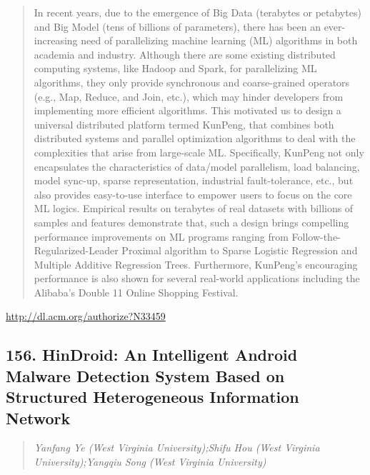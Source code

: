 \documentclass{article}
\begin{document}
\begin{quote}
In recent years, due to the emergence of Big Data (terabytes or petabytes) and Big Model (tens of billions of parameters), there has been an ever-increasing need of parallelizing machine learning (ML) algorithms in both academia and industry. Although there are some existing distributed computing systems, like Hadoop and Spark, for parallelizing ML algorithms, they only provide synchronous and coarse-grained operators (e.g., Map, Reduce, and Join, etc.), which may hinder developers from implementing more efficient algorithms. This motivated us to design a universal distributed platform termed KunPeng, that combines both distributed systems and parallel optimization algorithms to deal with the complexities that arise from large-scale ML. Specifically, KunPeng not only encapsulates the characteristics of data/model parallelism, load balancing, model sync-up, sparse representation, industrial fault-tolerance, etc., but also provides easy-to-use interface to empower users to focus on the core ML logics. Empirical results on terabytes of real datasets with billions of samples and features demonstrate that, such a design brings compelling performance improvements on ML programs ranging from Follow-the-Regularized-Leader Proximal algorithm to Sparse Logistic Regression and Multiple Additive Regression Trees. Furthermore, KunPeng’s encouraging performance is also shown for several real-world applications including the Alibaba’s Double 11 Online Shopping Festival.
\end{quote}

\href{http://dl.acm.org/authorize?N33459}{http://dl.acm.org/authorize?N33459}

\subsection{156. HinDroid: An Intelligent Android Malware Detection System Based on Structured Heterogeneous Information Network}

\begin{quote}
\footnotesize{\textit{Yanfang Ye (West Virginia University);Shifu Hou (West Virginia University);Yangqiu Song (West Virginia University)}}

\end{quote}
\end{document}
